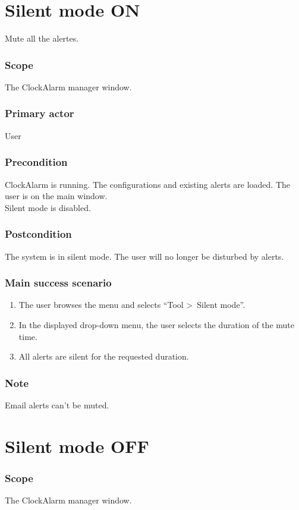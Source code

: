 \section{Silent mode ON}\label{subsec:usecase_silent_on}
Mute all the alertes.
\subsubsection{Scope}
The ClockAlarm manager window.
\subsubsection{Primary actor}
User
\subsubsection{Precondition}
ClockAlarm is running. The configurations and existing alerts are loaded. The user is on the main window.
\\Silent mode is disabled.
\subsubsection{Postcondition}
The system is in silent mode. The user will no longer be disturbed by alerts.
\subsubsection{Main success scenario}
\begin{enumerate}
	\item The user browses the menu and selects ``Tool \textgreater~Silent mode''.
	\item In the displayed drop-down menu, the user selects the duration of the mute time.
	\item All alerts are silent for the requested duration.
\end{enumerate}
\subsubsection{Note}
Email alerts can't be muted.

\section{Silent mode OFF}\label{subsec:usecase_silent_off}

\subsubsection{Scope}
The ClockAlarm manager window.
